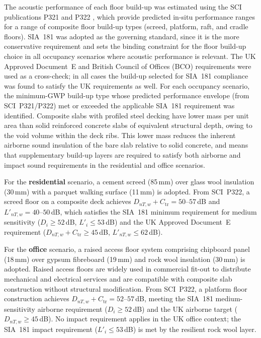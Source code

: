 The acoustic performance of each floor build-up was estimated using the SCI publications P321 \citep{RefWorks:RefID:acousticslimdek} and P322 \citep{RefWorks:acousticcomposite}, which provide predicted in-situ performance ranges for a range of composite floor build-up types (screed, platform, raft, and cradle floors). SIA~181 was adopted as the governing standard, since it is the more conservative requirement and sets the binding constraint for the floor build-up choice in all occupancy scenarios where acoustic performance is relevant. The UK Approved Document~E and British Council of Offices (BCO) requirements were used as a cross-check; in all cases the build-up selected for SIA~181 compliance was found to satisfy the UK requirements as well. For each occupancy scenario, the minimum-GWP build-up type whose predicted performance envelope (from SCI~P321/P322) met or exceeded the applicable SIA~181 requirement was identified. Composite slabs with profiled steel decking have lower mass per unit area than solid reinforced concrete slabs of equivalent structural depth, owing to the void volume within the deck ribs. This lower mass reduces the inherent airborne sound insulation of the bare slab relative to solid concrete, and means that supplementary build-up layers are required to satisfy both airborne and impact sound requirements in the residential and office scenarios.

For the \textbf{residential} scenario, a cement screed (85\,mm) over glass wool insulation (30\,mm) with a parquet walking surface (11\,mm) is adopted. From SCI~P322, a screed floor on a composite deck achieves $D_{nT,w}+C_\mathrm{tr} = 50$--$57$\,dB and $L'_{nT,w} = 40$--$50$\,dB, which satisfies the SIA~181 minimum requirement for medium sensitivity ($D_i \ge 52$\,dB, $L'_i \le 53$\,dB) and the UK Approved Document~E requirement ($D_{nT,w}+C_\mathrm{tr} \ge 45$\,dB, $L'_{nT,w} \le 62$\,dB).

For the \textbf{office} scenario, a raised access floor system comprising chipboard panel (18\,mm) over gypsum fibreboard (19\,mm) and rock wool insulation (30\,mm) is adopted. Raised access floors are widely used in commercial fit-out to distribute mechanical and electrical services and are compatible with composite slab construction without structural modification. From SCI~P322, a platform floor construction achieves $D_{nT,w}+C_\mathrm{tr} = 52$--$57$\,dB, meeting the SIA~181 medium-sensitivity airborne requirement ($D_i \ge 52$\,dB) and the UK airborne target ($D_{nT,w} \ge 45$\,dB). No impact requirement applies in the UK office context; the SIA~181 impact requirement ($L'_i \le 53$\,dB) is met by the resilient rock wool layer.

